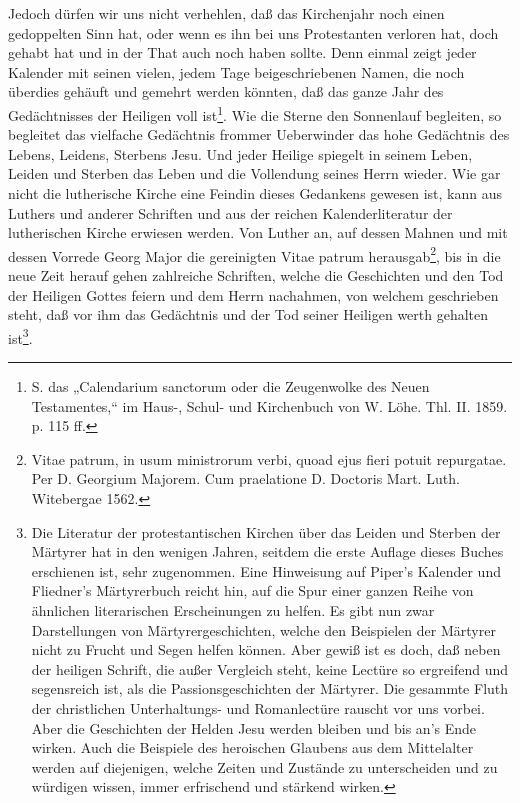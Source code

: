 Jedoch dürfen wir uns nicht verhehlen, daß das Kirchenjahr noch einen gedoppelten Sinn hat, oder wenn es ihn bei uns Protestanten verloren hat, doch gehabt hat und in der That auch noch haben sollte. Denn einmal zeigt jeder Kalender mit seinen vielen, jedem Tage beigeschriebenen Namen, die noch überdies gehäuft und gemehrt werden könnten, daß das ganze Jahr des Gedächtnisses der Heiligen voll ist\footnote{S. das „Calendarium sanctorum oder die Zeugenwolke des Neuen Testamentes,“ im Haus-, Schul- und Kirchenbuch von W. Löhe. Thl. II. 1859. p. 115 ff.}. Wie die Sterne den Sonnenlauf begleiten, so begleitet das vielfache Gedächtnis frommer Ueberwinder das hohe Gedächtnis des Lebens, Leidens, Sterbens Jesu. Und jeder Heilige spiegelt in seinem Leben, Leiden und Sterben das Leben und
die Vollendung seines Herrn wieder. Wie gar nicht die lutherische Kirche eine Feindin dieses Gedankens gewesen ist, kann aus Luthers und anderer Schriften und aus der reichen Kalenderliteratur der lutherischen Kirche erwiesen werden. Von Luther an, auf dessen Mahnen und mit dessen Vorrede Georg Major die gereinigten Vitae patrum herausgab\footnote{Vitae patrum, in usum ministrorum verbi, quoad ejus fieri potuit repurgatae. Per D. Georgium Majorem. Cum praelatione D. Doctoris Mart. Luth. Witebergae 1562.}, bis in die neue Zeit herauf gehen zahlreiche Schriften, welche die Geschichten und den Tod der Heiligen Gottes feiern und dem Herrn nachahmen, von welchem geschrieben steht, daß vor ihm das Gedächtnis und der Tod seiner Heiligen werth gehalten ist\footnote{Die Literatur der protestantischen Kirchen über das Leiden und Sterben der Märtyrer hat in den wenigen Jahren, seitdem die erste Auflage dieses Buches erschienen ist, sehr zugenommen. Eine Hinweisung auf Piper’s Kalender und Fliedner’s Märtyrerbuch reicht hin, auf die Spur einer ganzen Reihe von ähnlichen literarischen Erscheinungen zu helfen. Es gibt nun zwar Darstellungen von Märtyrergeschichten, welche den Beispielen der Märtyrer nicht zu Frucht und Segen helfen können. Aber gewiß ist es doch, daß neben der heiligen Schrift, die außer Vergleich steht, keine Lectüre so ergreifend und segensreich ist, als die Passionsgeschichten der Märtyrer. Die gesammte Fluth der christlichen Unterhaltungs- und Romanlectüre rauscht vor uns vorbei. Aber die Geschichten der Helden Jesu werden bleiben und bis an’s Ende wirken. Auch die Beispiele des heroischen Glaubens aus dem Mittelalter werden auf diejenigen, welche Zeiten und Zustände zu unterscheiden und zu würdigen wissen, immer erfrischend und stärkend wirken.}.

